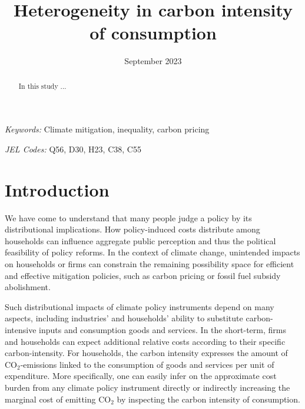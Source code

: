 \documentclass[12pt, a4paper]{article}
\title{Heterogeneity in carbon intensity of consumption}
\date{September 2023}
\begin{document}
\maketitle
\begin{abstract}
  In this study ...
\end{abstract}

\smallskip

\noindent \small \textit{Keywords:} Climate mitigation, inequality, carbon pricing

\noindent \small \textit{JEL Codes:} Q56, D30, H23, C38, C55

\thispagestyle{empty}
\clearpage
\setcounter{page}{1}

\section{Introduction} \label{sec:introduction}

We have come to understand that many people judge a policy by its distributional implications. How policy-induced costs distribute among households can influence aggregate public perception and thus the political feasibility of policy reforms. In the context of climate change, unintended impacts on households or firms can constrain the remaining possibility space for efficient and effective mitigation policies, such as carbon pricing or fossil fuel subsidy abolishment.


Such distributional impacts of climate policy instruments depend on many aspects, including industries' and households' ability to substitute carbon-intensive inputs and consumption goods and services. In the short-term, firms and households can expect additional relative costs according to their specific carbon-intensity. For households, the carbon intensity expresses the amount of CO$_{2}$-emissions linked to the consumption of goods and services per unit of expenditure. More specifically, one can easily infer on the approximate cost burden from any climate policy instrument directly or indirectly increasing the marginal cost of emitting CO$_{2}$ by inspecting the carbon intensity of consumption.
\end{document}
